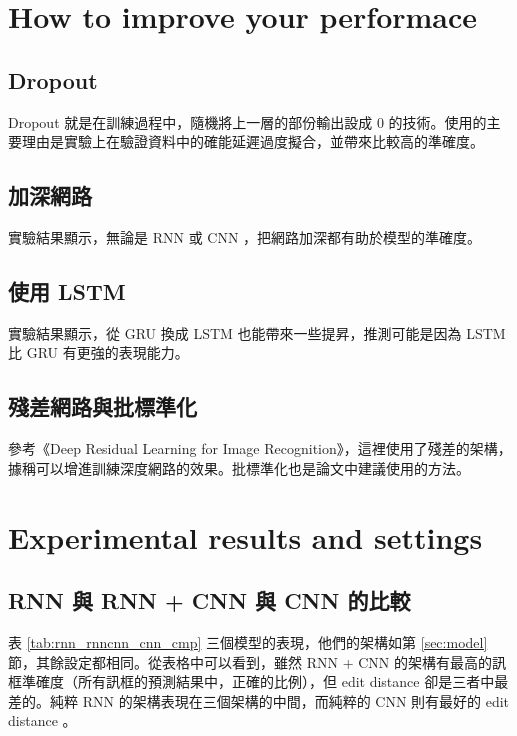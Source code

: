 \documentclass[fleqn,a4paper,12pt]{article}
\begin{document}
\section{How to improve your performace}

\subsection{Dropout}

Dropout 就是在訓練過程中，隨機將上一層的部份輸出設成 0 的技術。使用的主要理由是實驗上在驗證資料中的確能延遲過度擬合，並帶來比較高的準確度。

\subsection{加深網路}

實驗結果顯示，無論是 RNN 或 CNN ，把網路加深都有助於模型的準確度。

\subsection{使用 LSTM}

實驗結果顯示，從 GRU 換成 LSTM 也能帶來一些提昇，推測可能是因為 LSTM 比 GRU 有更強的表現能力。

\subsection{殘差網路與批標準化}

參考《Deep Residual Learning for Image Recognition》，這裡使用了殘差的架構，據稱可以增進訓練深度網路的效果。批標準化也是論文中建議使用的方法。

\section{Experimental results and settings}

\subsection{RNN 與 RNN + CNN 與 CNN 的比較}

表 \ref{tab:rnn_rnncnn_cnn_cmp} 三個模型的表現，他們的架構如第 \ref{sec:model} 節，其餘設定都相同。從表格中可以看到，雖然 RNN + CNN 的架構有最高的訊框準確度（所有訊框的預測結果中，正確的比例），但 edit distance 卻是三者中最差的。純粹 RNN 的架構表現在三個架構的中間，而純粹的 CNN 則有最好的 edit distance 。
\end{document}
